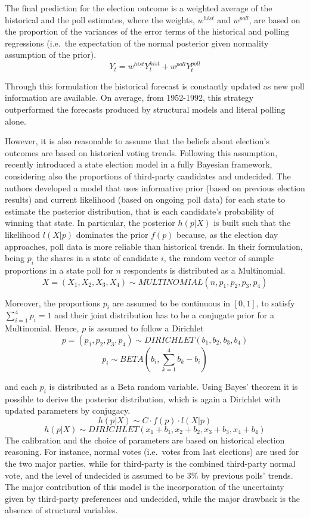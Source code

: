 \documentclass[
  12pt]{article}
\begin{document}
The final prediction for the election outcome is a weighted average of
the historical and the poll estimates, where the weights, \(w^{hist}\)
and \(w^{poll}\), are based on the proportion of the variances of the
error terms of the historical and polling regressions (i.e.~the
expectation of the normal posterior given normality assumption of the
prior). \[Y_{t} =  w^{hist} Y_{t}^{hist} + w^{poll} Y_{t}^{poll}\]

Through this formulation the historical forecast is constantly updated
as new poll information are available. On average, from 1952-1992, this
strategy outperformed the forecasts produced by structural models and
literal polling alone.

However, it is also reasonable to assume that the beliefs about
election's outcomes are based on historical voting trends. Following
this assumption, \citet{rig:2009} recently introduced a state election
model in a fully Bayesian framework, considering also the proportions of
third-party candidates and undecided. The authors developed a model that
uses informative prior (based on previous election results) and current
likelihood (based on ongoing poll data) for each state to estimate the
posterior distribution, that is each candidate's probability of winning
that state. In particular, the posterior \(h(p|X)\) is built such that
the likelihood \(l(X|p)\) dominates the prior \(f(p)\) because, as the
election day approaches, poll data is more reliable than historical
trends. In their formulation, being \(p_i\) the shares in a state of
candidate \(i\), the random vector of sample proportions in a state poll
for \(n\) respondents is distributed as a Multinomial.
\[X = (X_1, X_2, X_3, X_4) \sim MULTINOMIAL(n, p_1, p_2, p_3, p_4)\]

Moreover, the proportions \(p_i\) are assumed to be continuous in
\([0,1]\), to satisfy \(\sum_{i = 1}^{4} p_i = 1\) and their joint
distribution has to be a conjugate prior for a Multinomial. Hence, \(p\)
is assumed to follow a Dirichlet
\[p = (p_1, p_2, p_3, p_4) \sim DIRICHLET(b_1, b_2, b_3, b_4)\]
\[p_i \sim BETA(b_i, \sum_{k = 1}^{4} b_k - b_i)\]

and each \(p_i\) is distributed as a Beta random variable. Using Bayes'
theorem it is possible to derive the posterior distribution, which is
again a Dirichlet with updated parameters by conjugacy.
\[h(p|X) \sim C \cdot f(p) \cdot l(X|p)\]
\[h(p|X) \sim DIRICHLET(x_1 + b_1, x_2 + b_2, x_3 + b_3, x_4 + b_4)\]
The calibration and the choice of parameters are based on historical
election reasoning. For instance, normal votes (i.e.~votes from last
elections) are used for the two major parties, while for third-party is
the combined third-party normal vote, and the level of undecided is
assumed to be 3\% by previous polls' trends. The major contribution of
this model is the incorporation of the uncertainty given by third-party
preferences and undecided, while the major drawback is the absence of
structural variables.
\end{document}
